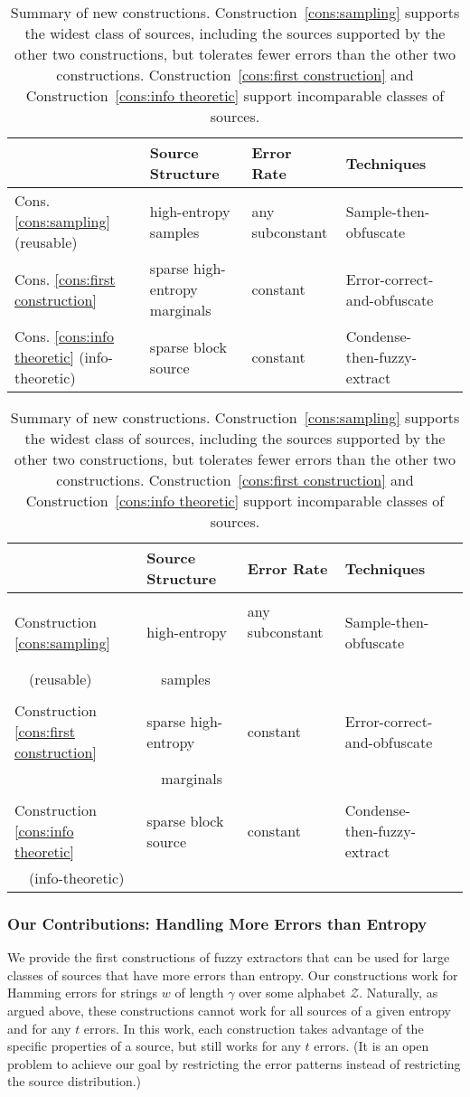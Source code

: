 \documentclass[11pt]{article}
\renewcommand{\paragraph}[1]{\subsubsection{#1}}
\newcommand{\consref}[1]{\mbox{Construction~\ref{#1}}}
\begin{document}
\begin{table}
\begin{center}
\ifnum{}
\begin{tabular}{l l l l l}
  & Source Structure & Error Rate  & Techniques\\
\hline
Cons. \ref{cons:sampling} (reusable)  & high-entropy samples & any subconstant &  Sample-then-obfuscate \\
Cons. \ref{cons:first construction}  & sparse high-entropy  marginals & constant &  Error-correct-and-obfuscate\\
Cons. \ref{cons:info theoretic} (info-theoretic)   & sparse block source  & constant & Condense-then-fuzzy-extract\\
\end{tabular}
\else
\begin{tabular}{l l l l l}
  & Source Structure & Error Rate  & Techniques\\
\hline \vspace{-3mm} \\
Construction \ref{cons:sampling} & high-entropy & any subconstant \ \ &  Sample-then-obfuscate \\
\ \ (reusable)& \ \ samples\\ \vspace{-3mm} \\
Construction \ref{cons:first construction}  & sparse high-entropy \ \  & constant &  Error-correct-and-obfuscate\\
& \ \ marginals\\ \vspace{-3mm} \\
Construction \ref{cons:info theoretic}   & sparse block source  & constant & Condense-then-fuzzy-extract\\
\ \ (info-theoretic)\\
\hline\end{tabular}
\fi
\end{center}
\caption{Summary of new constructions. \consref{cons:sampling} supports the widest class of sources, including the sources supported by the other two constructions, but tolerates fewer errors than the other two constructions.  \consref{cons:first construction} and \consref{cons:info theoretic} support incomparable classes of sources.}
\label{tab:upper bounds}
\end{table}

\paragraph{Our Contributions: Handling More Errors than Entropy}
We provide the first constructions of fuzzy extractors that can be used for large classes of sources that have more errors than entropy.  Our constructions work for Hamming errors for strings $w$ of length $\gamma$ over some alphabet $\mathcal{Z}$. Naturally, as argued above, these constructions cannot work for all sources of a given entropy and for any $t$ errors. In this work, each construction takes advantage of the specific properties of a source, but still works for any $t$ errors. (It is an open problem to achieve our goal by restricting the error patterns instead of restricting the source distribution.)
\end{document}
